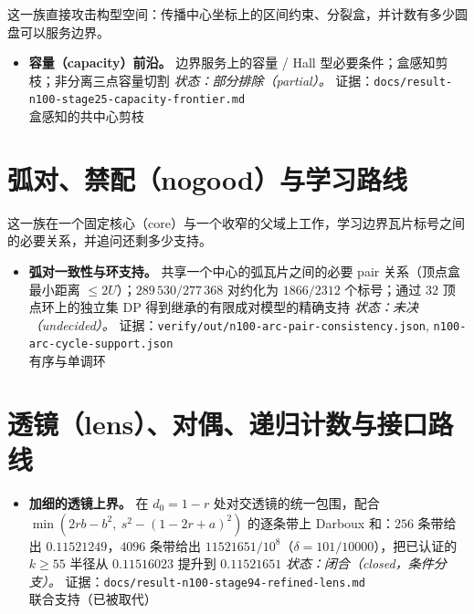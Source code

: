 这一族直接攻击构型空间：传播中心坐标上的区间约束、分裂盒，并计数有多少圆盘可以服务边界。

\begin{itemize}[leftmargin=1.2em,itemsep=3pt]
\item \textbf{容量（capacity）前沿。} 边界服务上的容量 / Hall 型必要条件；盒感知剪枝；非分离三点容量切割 \emph{状态：部分排除（partial）。} 证据：{\footnotesize\texttt{docs/\allowbreak{}result-\allowbreak{}n100-\allowbreak{}stage25-\allowbreak{}capacity-\allowbreak{}frontier.md}} \\
盒感知的共中心剪枝
\end{itemize}


\section{弧对、禁配（nogood）与学习路线}

这一族在一个固定核心（core）与一个收窄的父域上工作，学习边界瓦片标号之间的必要关系，并追问还剩多少支持。

\begin{itemize}[leftmargin=1.2em,itemsep=3pt]
\item \textbf{弧对一致性与环支持。} 共享一个中心的弧瓦片之间的必要 pair 关系（顶点盒最小距离 $\le2U$）；$289\,530/277\,368$ 对约化为 $1866/2312$ 个标号；通过 $32$ 顶点环上的独立集 DP 得到继承的有限成对模型的精确支持 \emph{状态：未决（undecided）。} 证据：\texttt{verify/\allowbreak{}out/\allowbreak{}n100-\allowbreak{}arc-\allowbreak{}pair-\allowbreak{}consistency.json}, \texttt{n100-\allowbreak{}arc-\allowbreak{}cycle-\allowbreak{}support.json} \\
有序与单调环
\end{itemize}


\section{透镜（lens）、对偶、递归计数与接口路线}

\begin{itemize}[leftmargin=1.2em,itemsep=3pt]
\item \textbf{加细的透镜上界。} 在 $d_0=1-r$ 处对交透镜的统一包围，配合 $\min(2rb-b^2,\ s^2-(1-2r+a)^2)$ 的逐条带上 Darboux 和：$256$ 条带给出 $0.11521249$，$4096$ 条带给出 $11521651/10^{8}$（$\delta=101/10000$），把已认证的 $k\ge55$ 半径从 $0.11516023$ 提升到 $0.11521651$ \emph{状态：闭合（closed，条件分支）。} 证据：{\footnotesize\texttt{docs/\allowbreak{}result-\allowbreak{}n100-\allowbreak{}stage94-\allowbreak{}refined-\allowbreak{}lens.md}} \\
联合支持（已被取代）
\end{itemize}


